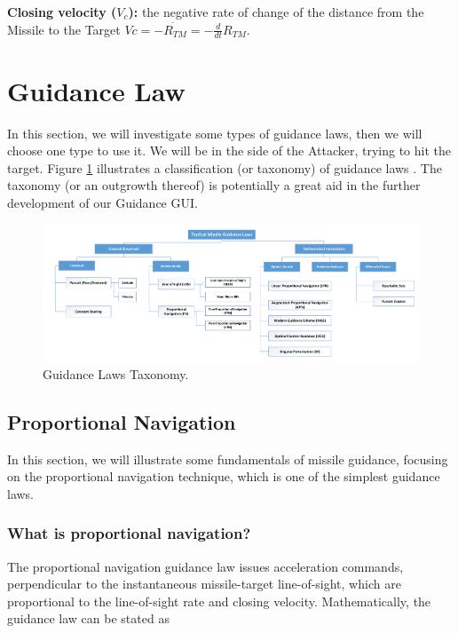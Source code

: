 \textbf{Closing velocity ($V_c$):} the negative rate of change of the distance
from the Missile to the Target $Vc= -\dot{R_{TM}}=-\frac{d}{dt} R_{TM} $.


\section{Guidance Law}


In this section, we will investigate some types of guidance laws, then we will choose one type to use it. We will be in the side of the Attacker, trying to hit the target. Figure \ref{GL taxonomy} illustrates a classification (or taxonomy) of guidance laws \cite{ghose2012guidance}. The taxonomy (or an outgrowth thereof) is potentially a great aid in the further development of our Guidance GUI.

\begin{landscape}
\begin{figure}[H]
	\centering
	\includegraphics[scale = 0.5]{fig/GuidanceLaws.pdf}
	\caption{Guidance Laws Taxonomy.}
	\label{GL taxonomy}
\end{figure}
\end{landscape}

\subsection{Proportional Navigation}
In this section, we will illustrate some fundamentals of missile guidance, focusing on the proportional navigation technique, which is one of the simplest guidance laws.

\subsubsection*{What is proportional navigation?}
The proportional navigation guidance law issues acceleration commands,
perpendicular to the instantaneous missile-target line-of-sight, which are
proportional to the line-of-sight rate and closing velocity. Mathematically, the
guidance law can be stated as

